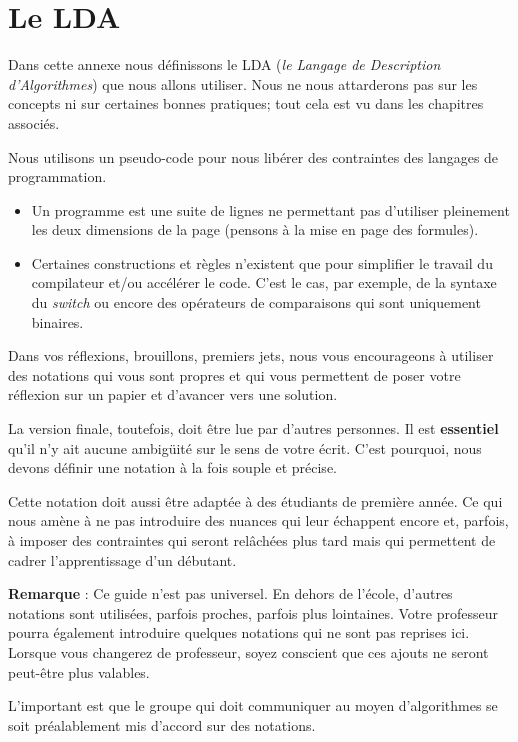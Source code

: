 \chapter{Le LDA}

Dans cette annexe nous définissons le LDA
(\emph{le Langage de Description d'Algorithmes})
que nous allons utiliser. 
Nous ne nous attarderons pas sur les concepts
ni sur certaines bonnes pratiques;
tout cela est vu dans les chapitres associés.

Nous utilisons un pseudo-code pour nous libérer 
des contraintes des langages de programmation.
\begin{itemize}
\item
	Un programme est une suite de lignes
	ne permettant pas d'utiliser pleinement les
	deux dimensions de la page 
	(pensons à la mise en page des formules).
\item
	Certaines constructions et règles
	n'existent que pour simplifier le travail du compilateur
	et/ou accélérer le code.
	C'est le cas, par exemple, de la syntaxe du \emph{switch}
	ou encore des opérateurs de comparaisons qui sont uniquement
	binaires.
\end{itemize}

Dans vos réflexions, brouillons, premiers jets,
nous vous encourageons à utiliser des notations
qui vous sont propres et qui vous permettent
de poser votre réflexion sur un papier
et d'avancer vers une solution.

La version finale, toutefois, 
doit être lue par d'autres personnes.
Il est \textbf{essentiel} qu'il n'y ait aucune ambigüité
sur le sens de votre écrit.
C'est pourquoi, nous devons définir une notation
à la fois souple et précise.

Cette notation doit aussi être adaptée à des étudiants de première année.
Ce qui nous amène à ne pas introduire des nuances qui leur échappent encore
et, parfois, à imposer des contraintes qui seront relâchées plus tard
mais qui permettent de cadrer l'apprentissage d'un débutant.

\textbf{Remarque} : Ce guide n'est pas universel.
En dehors de l'école, d'autres notations sont utilisées,
parfois proches, parfois plus lointaines.
Votre professeur pourra également introduire quelques notations
qui ne sont pas reprises ici. 
Lorsque vous changerez de professeur,
soyez conscient que ces ajouts ne seront peut-être plus valables.

L'important est que le groupe qui doit communiquer
au moyen d'algorithmes se soit préalablement mis d'accord 
sur des notations.

